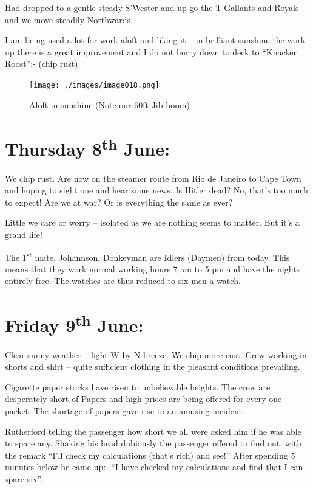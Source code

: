 \documentclass[
  11pt,
  msmallroyalvopaper
]{memoir}
\begin{document}
Had dropped to a gentle steady S'Wester and up go the T'Gallants and
Royals and we move steadily Northwards.

I am being used a lot for work aloft and liking it -- in brilliant
sunshine the work up there is a great improvement and I do not hurry
down to deck to ``Knacker Roost'':- (chip rust).

\begin{figure}
\centering
\texttt{[image: ./images/image018.png]}
\caption{Aloft in sunshine (Note our 60ft Jib-boom)}
\end{figure}

\hypertarget{thursday-8th-june}{%
\section{\texorpdfstring{Thursday 8\textsuperscript{th}
June:}{Thursday 8th June:}}\label{thursday-8th-june}}

We chip rust. Are now on the steamer route from Rio de Janeiro to Cape
Town and hoping to sight one and hear some news. Is Hitler dead? No,
that's too much to expect! Are we at war? Or is everything the same as
ever?

Little we care or worry -- isolated as we are nothing seems to matter.
But it's a grand life!

The 1\textsuperscript{st} mate, Johannson, Donkeyman are Idlers (Daymen)
from today. This means that they work normal working hours 7 am to 5 pm
and have the nights entirely free. The watches are thus reduced to six
men a watch.

\hypertarget{friday-9th-june}{%
\section{\texorpdfstring{Friday 9\textsuperscript{th}
June:}{Friday 9th June:}}\label{friday-9th-june}}

Clear sunny weather -- light W by N breeze. We chip more rust. Crew
working in shorts and shirt -- quite sufficient clothing in the pleasant
conditions prevailing.

Cigarette paper stocks have risen to unbelievable heights. The crew are
desperately short of Papers and high prices are being offered for every
one packet. The shortage of papers gave rise to an amusing incident.

Rutherford telling the passenger how short we all were asked him if he
was able to spare any. Shaking his head dubiously the passenger offered
to find out, with the remark ``I'll check my calculations (that's rich)
and see!'' After spending 5 minutes below he came up:- ``I have checked
my calculations and find that I can spare six''.
\end{document}
